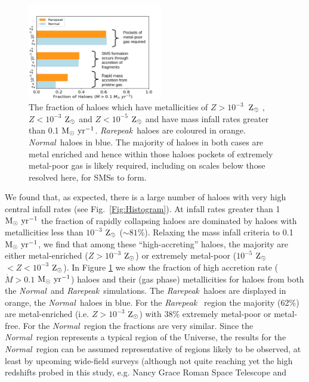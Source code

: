 \documentclass[twocolumn,iop,revtex4]{openjournal}
\newcommand{\msolaryr} {$\rm{M_{\odot}~yr^{-1}}~$}
\newcommand{\msolaryrc} {$\rm{M_{\odot}~yr^{-1}}$}
\newcommand{\zsolar} {$\rm{Z_{\odot}}~$}
\newcommand{\zsolarc} {$\rm{Z_{\odot}}$}
\newcommand{\rarepeak} {\textit{Rarepeak~}}
\newcommand{\normal} {\textit{Normal~}}
\begin{document}
\begin{figure}
   \centering 
\includegraphics[width=0.525\textwidth]{FIGURES/FinalPlot-crop.pdf}
\caption{The fraction of haloes which have metallicities of $Z > 10^{-3}$~\zsolar,
  $Z < 10^{-3}$ \zsolar and $ Z < 10^{-5}$ \zsolar and have mass infall rates greater than
  0.1 \msolaryrc. \rarepeak haloes are coloured in orange. \normal haloes in blue. 
  The majority of haloes in both cases are metal enriched and hence within
  those haloes pockets of extremely metal-poor gas 
  is likely required, including on scales below those resolved here, for SMSs to form. } \label{Fig:Fractions}
\end{figure}
\indent We found that, as expected, there is a large number of haloes with
very high central infall rates (see Fig.~\ref{Fig:Histogram}). At infall rates
greater than 1 \msolaryr the fraction of rapidly collapsing haloes are dominated by haloes with
metallicities less than $10^{-3}$ \zsolar ($\sim 81$\%).
Relaxing the
mass infall criteria to 0.1 \msolaryrc,
we find that among these ``high-accreting''
haloes, the majority are either metal-enriched ($Z > 10^{-3}$ \zsolarc) or
extremely metal-poor ($10^{-5}$ \zsolar $ < Z < 10^{-3}$ \zsolarc). In Figure \ref{Fig:Fractions}
we show the fraction of high accretion rate ($\dot{M} > 0.1$ \msolaryrc) haloes and
their (gas phase) metallicities for haloes from both the \normal and \rarepeak simulations.
The \rarepeak haloes are displayed in orange, the \normal haloes in blue. For the \rarepeak
region the majority (62\%) are metal-enriched (i.e. $Z > 10^{-3}$ \zsolarc) with 38\% extremely
metal-poor or metal-free. For the \normal region the fractions are very similar.
Since the \normal region represents a typical
region of the Universe, the results for the \normal region can be assumed representative of 
regions likely to be observed, at least by upcoming wide-field surveys (although not quite
reaching yet the high redshifts probed in this study, e.g. Nancy Grace Roman Space Telescope and
\end{document}
